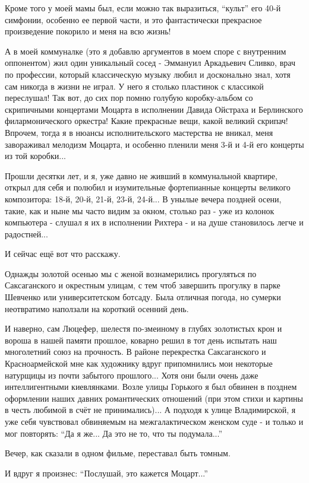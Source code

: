 Кроме того у моей мамы был, если можно так выразиться, \enquote{культ} его 40-й
симфонии, особенно ее первой части, и это фантастически прекрасное произведение
покорило и меня на всю жизнь!

А в моей коммуналке (это я добавлю аргументов в моем споре с внутренним
оппонентом) жил один уникальный сосед - Эммануил Аркадьевич Сливко, врач по
профессии, который классическую музыку любил и досконально знал, хотя сам
никогда в жизни не играл. У него я столько пластинок с классикой переслушал!
Так вот, до сих пор помню голубую коробку-альбом со скрипичными концертами
Моцарта в исполнении Давида Ойстраха и Берлинского филармонического оркестра!
Какие прекрасные вещи, какой великий скрипач! Впрочем, тогда я в нюансы
исполнительского мастерства не вникал, меня завораживал мелодизм Моцарта, и
особенно пленили меня 3-й и 4-й его концерты из той коробки...

Прошли десятки лет, и я, уже давно не живший в коммунальной квартире, открыл
для себя и полюбил и изумительные фортепианные концерты великого композитора:
18-й, 20-й, 21-й, 23-й, 24-й... В унылые вечера поздней осени, такие, как и
ныне мы часто видим за окном, столько раз - уже из колонок компьютера - слушал
я их в исполнении Рихтера - и на душе становилось легче и радостней...

И сейчас ещё вот что расскажу.

Однажды золотой осенью мы с женой вознамерились прогуляться по Саксаганского и
окрестным улицам, с тем чтоб завершить прогулку в парке Шевченко или
университетском ботсаду. Была отличная погода, но сумерки неотвратимо наползали
на короткий осенний день. 

И наверно, сам Люцефер, шелестя по-змеиному в глубях золотистых крон и вороша в
нашей памяти прошлое, коварно решил в тот день испытать наш многолетний союз на
прочность. В районе перекрестка Саксаганского и Красноармейской мне как
художнику вдруг припомнились мои некоторые натурщицы из почти забытого
прошлого... Хотя они были очень даже интеллигентными киевлянками. Возле улицы
Горького я был обвинен в позднем оформлении наших давних романтических
отношений (при этом стихи и картины в честь любимой в счёт не принимались)... А
подходя к улице Владимирской, я уже себя чувствовал обвиняемым на
межгалактическом женском суде - и только и мог повторять: \enquote{Да я же... Да это не
то, что ты подумала...}  

Вечер, как сказали в одном фильме, переставал быть томным.

И вдруг я произнес: \enquote{Послушай, это кажется Моцарт...}


